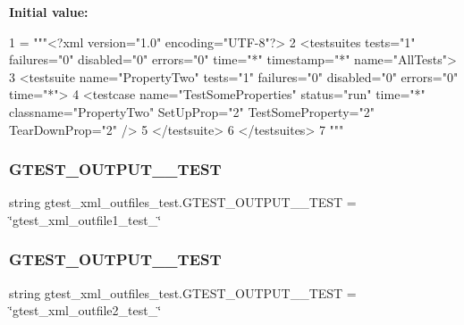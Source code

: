 {\bfseries Initial value\+:}
\begin{DoxyCode}
1 =  \textcolor{stringliteral}{"""<?xml version="1.0" encoding="UTF-8"?>}
2 \textcolor{stringliteral}{<testsuites tests="1" failures="0" disabled="0" errors="0" time="*" timestamp="*" name="AllTests">}
3 \textcolor{stringliteral}{  <testsuite name="PropertyTwo" tests="1" failures="0" disabled="0" errors="0" time="*">}
4 \textcolor{stringliteral}{    <testcase name="TestSomeProperties" status="run" time="*" classname="PropertyTwo" SetUpProp="2"
       TestSomeProperty="2" TearDownProp="2" />}
5 \textcolor{stringliteral}{  </testsuite>}
6 \textcolor{stringliteral}{</testsuites>}
7 \textcolor{stringliteral}{"""}
\end{DoxyCode}
\mbox{\label{namespacegtest__xml__outfiles__test_a92ab09e944d010f8abfaa3ca453fa68c}} 
\subsubsection{\texorpdfstring{G\+T\+E\+S\+T\+\_\+\+O\+U\+T\+P\+U\+T\+\_\+\_\+\+T\+E\+ST}{GTEST\_OUTPUT\_1\_TEST}}
{\footnotesize\ttfamily string gtest\+\_\+xml\+\_\+outfiles\+\_\+test.\+G\+T\+E\+S\+T\+\_\+\+O\+U\+T\+P\+U\+T\+\_\+\_\+\+T\+E\+ST = \char`\"{}gtest\+\_\+xml\+\_\+outfile1\+\_\+test\+\_\+\char`\"{}}

\mbox{\label{namespacegtest__xml__outfiles__test_acf82219e56619aab5c114b6f0a7c3a5e}} 
\subsubsection{\texorpdfstring{G\+T\+E\+S\+T\+\_\+\+O\+U\+T\+P\+U\+T\+\_\+\_\+\+T\+E\+ST}{GTEST\_OUTPUT\_2\_TEST}}
{\footnotesize\ttfamily string gtest\+\_\+xml\+\_\+outfiles\+\_\+test.\+G\+T\+E\+S\+T\+\_\+\+O\+U\+T\+P\+U\+T\+\_\+\_\+\+T\+E\+ST = \char`\"{}gtest\+\_\+xml\+\_\+outfile2\+\_\+test\+\_\+\char`\"{}}

